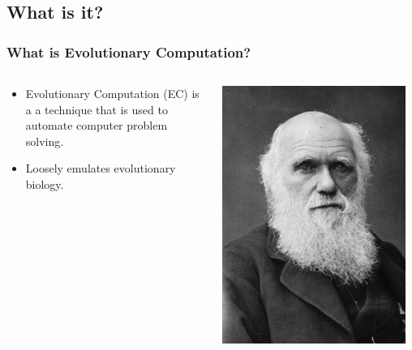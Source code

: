 \documentclass{beamer}
\begin{document}
\subsection[Evolutionary Computation]{What is it?}

\begin{frame}
  \frametitle{What is Evolutionary Computation?}
  \begin{columns}
  \begin{column}{0.6\textwidth}
  \begin{itemize}
  	\item Evolutionary Computation (EC) is a a technique that is used to automate computer problem solving.
  	\item Loosely emulates evolutionary biology.
  \end{itemize}
  \end{column}
  \begin{column}{0.4\textwidth}
   \includegraphics[width=0.95\textwidth]{Illustrations/darwin.jpg}
       \\
  \end{column}
  \end{columns}
\end{frame}
\end{document}
